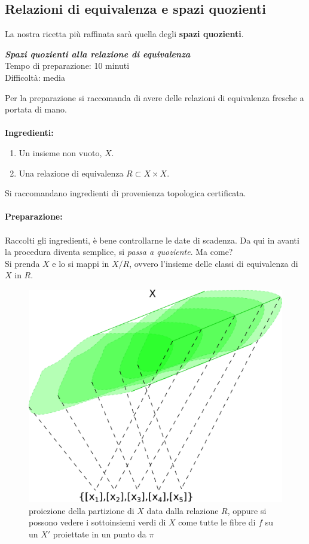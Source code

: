\newpage
\subsection{\textcolor{TopGener}{\textbf{Relazioni di equivalenza e spazi quozienti}}}
La nostra ricetta più raffinata sarà quella degli \textbf{spazi quozienti}. 

\begin{flushright}
	{\selectfont
		\textit{\textcolor{TopGener}{\textbf{Spazi quozienti alla relazione di equivalenza}}}\\
		Tempo di preparazione: 10 minuti\\
		Difficoltà: media
	}
\end{flushright}

Per la preparazione si raccomanda di avere delle relazioni di equivalenza fresche a portata di mano. \\ \\
{\Large \textbf{Ingredienti:}} \\
\begin{enumerate}
	\item Un insieme non vuoto, $X$.
	\item Una relazione di equivalenza $R \subset X \times X$.
\end{enumerate}
Si raccomandano ingredienti di provenienza topologica certificata.
\\ \\ {\Large \textbf{Preparazione:}} \\ \\
Raccolti gli ingredienti, è bene controllarne le date di scadenza. Da qui in avanti la procedura diventa semplice, si \textit{passa a quoziente}. Ma come? \\ Si prenda $X$ e lo si mappi in $X / R$, ovvero l'insieme delle classi di equivalenza di $X$ in $R$. 

\begin{figure}[h]
	\centering
	\includegraphics[width=0.5\linewidth]{images/topologia_generale/projection_quotient}
	\caption{proiezione della partizione di $X$ data dalla relazione $R$, oppure si possono vedere i sottoinsiemi verdi di $X$ come tutte le fibre di $f$ su un $X'$ proiettate in un punto da $\pi$}
	\label{fig:projectionquotient}
\end{figure}

